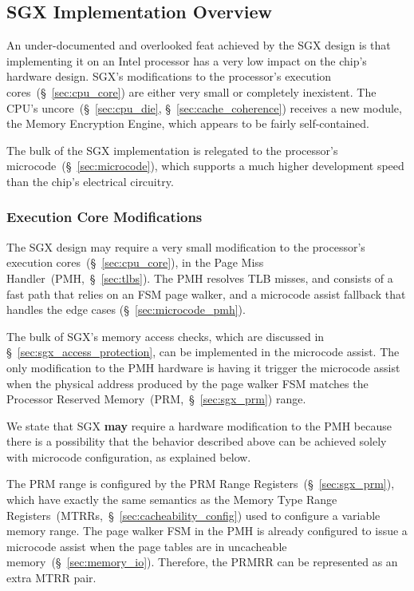 \subsection{SGX Implementation Overview}
\label{sec:sgx_implementation_overview}

An under-documented and overlooked feat achieved by the SGX design is that
implementing it on an Intel processor has a very low impact on the chip's
hardware design. SGX's modifications to the processor's execution
cores~(\S~\ref{sec:cpu_core}) are either very small or completely inexistent.
The CPU's uncore~(\S~\ref{sec:cpu_die}, \S~\ref{sec:cache_coherence}) receives
a new module, the  Memory Encryption Engine, which appears to be fairly
self-contained.

The bulk of the SGX implementation is relegated to the processor's
microcode~(\S~\ref{sec:microcode}), which supports a much higher development
speed than the chip's electrical circuitry.


\subsubsection{Execution Core Modifications}
\label{sec:sgx_core_modifications}

The SGX design may require a very small modification to the processor's
execution cores~(\S~\ref{sec:cpu_core}), in the Page Miss
Handler~(PMH,~\S~\ref{sec:tlbs}). The PMH resolves TLB misses, and consists of
a fast path that relies on an FSM page walker, and a microcode assist fallback
that handles the edge cases (\S~\ref{sec:microcode_pmh}).

The bulk of SGX's memory access checks, which are discussed in
\S~\ref{sec:sgx_access_protection}, can be implemented in the microcode assist.
The only modification to the PMH hardware is having it trigger the microcode
assist when the physical address produced by the page walker FSM matches the
Processor Reserved Memory~(PRM,~\S~\ref{sec:sgx_prm}) range.

We state that SGX \textbf{may} require a hardware modification to the PMH
because there is a possibility that the behavior described above can be
achieved solely with microcode configuration, as explained below.

The PRM range is configured by the PRM Range Registers~(\S~\ref{sec:sgx_prm}),
which have exactly the same semantics as the Memory Type Range
Registers~(MTRRs,~\S~\ref{sec:cacheability_config}) used to configure a
variable memory range. The page walker FSM in the PMH is already configured to
issue a microcode assist when the page tables are in uncacheable
memory~(\S~\ref{sec:memory_io}). Therefore, the PRMRR can be represented as an
extra MTRR pair.


